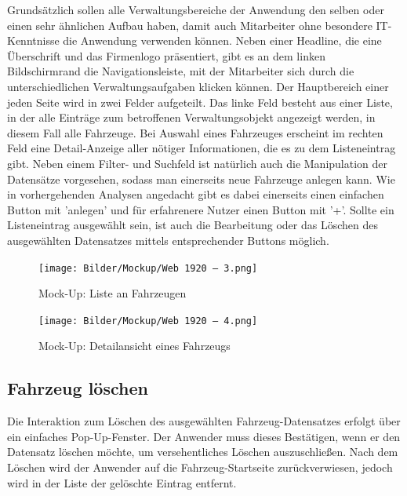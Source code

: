 Grundsätzlich sollen alle Verwaltungsbereiche der Anwendung den selben oder einen sehr ähnlichen Aufbau haben, damit auch Mitarbeiter ohne besondere IT-Kenntnisse die Anwendung verwenden können. Neben einer Headline, die eine Überschrift und das Firmenlogo präsentiert, gibt es an dem linken Bildschirmrand die Navigationsleiste, mit der Mitarbeiter sich durch die unterschiedlichen Verwaltungsaufgaben klicken können. Der Hauptbereich einer jeden Seite wird in zwei Felder aufgeteilt. Das linke Feld besteht aus einer Liste, in der alle Einträge zum betroffenen Verwaltungsobjekt angezeigt werden, in diesem Fall alle Fahrzeuge. Bei Auswahl eines Fahrzeuges erscheint im rechten Feld eine Detail-Anzeige aller nötiger Informationen, die es zu dem Listeneintrag gibt. Neben einem Filter- und Suchfeld ist natürlich auch die Manipulation der Datensätze vorgesehen, sodass man einerseits neue Fahrzeuge anlegen kann. Wie in vorhergehenden Analysen angedacht gibt es dabei einerseits einen einfachen Button mit 'anlegen' und für erfahrenere Nutzer einen Button mit '+'. Sollte ein Listeneintrag ausgewählt sein, ist auch die Bearbeitung oder das Löschen des ausgewählten Datensatzes mittels entsprechender Buttons möglich. 

\newpage

\begin{figure}[!ht]
    \centering
    \texttt{[image: Bilder/Mockup/Web 1920 – 3.png]}
    \caption{Mock-Up: Liste an Fahrzeugen}
    \label{mu:fahrzeugliste}
\end{figure}

\begin{figure}[!ht]
    \centering
    \texttt{[image: Bilder/Mockup/Web 1920 – 4.png]}
    \caption{Mock-Up: Detailansicht eines Fahrzeugs}
    \label{mu:fahrzeugdetails}
\end{figure}

\newpage

\subsection{Fahrzeug löschen}

Die Interaktion zum Löschen des ausgewählten Fahrzeug-Datensatzes erfolgt über ein einfaches Pop-Up-Fenster. Der Anwender muss dieses Bestätigen, wenn er den Datensatz löschen möchte, um versehentliches Löschen auszuschließen. Nach dem Löschen wird der Anwender auf die Fahrzeug-Startseite zurückverwiesen, jedoch wird in der Liste der gelöschte Eintrag entfernt. 


